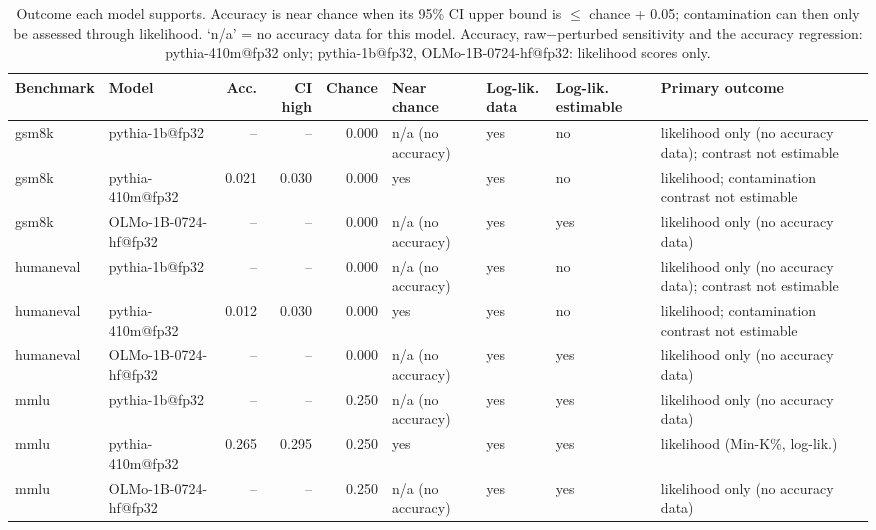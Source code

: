 \begin{table}[t]
\centering
\caption{Outcome each model supports. Accuracy is near chance when its 95\% CI upper bound is $\le$ chance + 0.05; contamination can then only be assessed through likelihood. `n/a' = no accuracy data for this model. Accuracy, raw$-$perturbed sensitivity and the accuracy regression: pythia-410m@fp32 only; pythia-1b@fp32, OLMo-1B-0724-hf@fp32: likelihood scores only. }
\label{tab:outcomes}
\begin{tabular}{llrrrllll}
\toprule
Benchmark & Model & Acc. & CI high & Chance & Near chance & Log-lik. data & Log-lik. estimable & Primary outcome \\
\midrule
gsm8k & pythia-1b@fp32 & -- & -- & 0.000 & n/a (no accuracy) & yes & no & likelihood only (no accuracy data); contrast not estimable \\
gsm8k & pythia-410m@fp32 & 0.021 & 0.030 & 0.000 & yes & yes & no & likelihood; contamination contrast not estimable \\
gsm8k & OLMo-1B-0724-hf@fp32 & -- & -- & 0.000 & n/a (no accuracy) & yes & yes & likelihood only (no accuracy data) \\
\midrule
humaneval & pythia-1b@fp32 & -- & -- & 0.000 & n/a (no accuracy) & yes & no & likelihood only (no accuracy data); contrast not estimable \\
humaneval & pythia-410m@fp32 & 0.012 & 0.030 & 0.000 & yes & yes & no & likelihood; contamination contrast not estimable \\
humaneval & OLMo-1B-0724-hf@fp32 & -- & -- & 0.000 & n/a (no accuracy) & yes & yes & likelihood only (no accuracy data) \\
\midrule
mmlu & pythia-1b@fp32 & -- & -- & 0.250 & n/a (no accuracy) & yes & yes & likelihood only (no accuracy data) \\
mmlu & pythia-410m@fp32 & 0.265 & 0.295 & 0.250 & yes & yes & yes & likelihood (Min-K\%, log-lik.) \\
mmlu & OLMo-1B-0724-hf@fp32 & -- & -- & 0.250 & n/a (no accuracy) & yes & yes & likelihood only (no accuracy data) \\
\bottomrule
\end{tabular}
\end{table}
